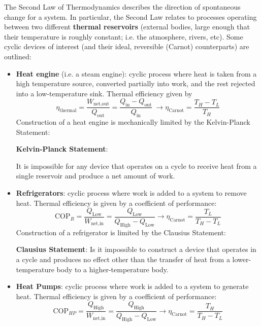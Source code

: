 The Second Law of Thermodynamics describes the direction of spontaneous change for a system. In particular, the Second Law relates to processes operating between two different \textbf{thermal reservoirs} (external bodies, large enough that their temperature is roughly constant; i.e. the atmosphere, rivers, etc). Some cyclic devices of interest (and their ideal, reversible (Carnot) counterparts) are outlined:

\begin{itemize}
    \item[] \textbf{Heat engine} (i.e. a steam engine): cyclic process where heat is taken from a high temperature source, converted partially into work, and the rest rejected into a low-temperature sink. Thermal efficiency given by \[\eta_\text{thermal} = \frac{W_\text{net,out}}{Q_\text{out}} = \frac{Q_\text{in}-Q_\text{out}}{Q_\text{in}}\ \longrightarrow \eta_\text{Carnot} = \frac{T_H-T_L}{T_H}\] Construction of a heat engine is mechanically limited by the Kelvin-Planck Statement: \begin{shaded}
\textbf{Kelvin-Planck Statement}:

It is impossible for any device that operates on a cycle to receive heat from a single reservoir and produce a net amount of work.
\end{shaded}

\item[] \textbf{Refrigerators}: cyclic process where work is added to a system to remove heat. Thermal efficiency is given by a coefficient of performance: \[\text{COP}_R = \frac{Q_\text{Low}}{W_\text{net,in}} = \frac{Q_\text{Low}}{Q_\text{High}-Q_\text{Low}}\longrightarrow \eta_\text{Carnot} = \frac{T_L}{T_H-T_L}\] Construction of a refrigerator is limited by the Clausius Statement: \begin{shaded}
    \textbf{Clausius Statement}:
Is it impossible to construct a device that operates in a cycle and produces no effect other than the transfer of heat from a lower-temperature body to a higher-temperature body.
\end{shaded}

\item[] \textbf{Heat Pumps}: cyclic process where work is added to a system to generate heat. Thermal efficiency is given by a coefficient of performance: \[\text{COP}_{HP} = \frac{Q_\text{High}}{W_\text{net,in}} = \frac{Q_\text{High}}{Q_\text{High}-Q_\text{Low}}\longrightarrow\eta_\text{Carnot} = \frac{T_H}{T_H-T_L}\]
\end{itemize}

